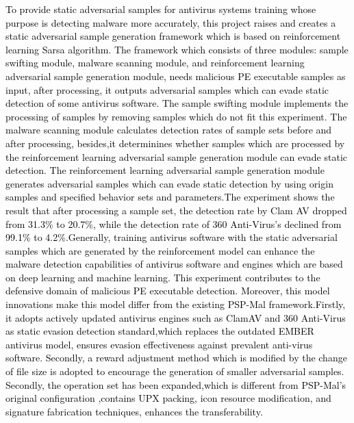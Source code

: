 \begin{abstractEn}
\textcolor{black}{To provide static adversarial samples for antivirus systems training whose purpose is detecting malware more accurately, this project raises and creates a static adversarial sample generation framework which is based on reinforcement learning Sarsa algorithm. The framework which consists of three modules: sample swifting module, malware scanning module, and reinforcement learning adversarial sample generation module, needs malicious PE executable samples as input, after processing, it outputs adversarial samples which can evade static detection of some antivirus software. The sample swifting module implements the processing of samples by removing samples which do not fit this experiment. The malware scanning module calculates detection rates of sample sets before and after processing, besides,it  determinines whether samples which are processed by the reinforcement learning adversarial sample generation module can evade static detection. The reinforcement learning adversarial sample generation module generates adversarial samples which can evade static detection by using origin samples and specified behavior sets and parameters.The experiment shows the result that after processing a sample set, the detection rate by Clam AV dropped from 31.3\% to 20.7\%, while the detection rate of 360 Anti-Virus’s declined from 99.1\% to 4.2\%.Generally, training antivirus software with the static adversarial samples which are generated by the reinforcement model can enhance the malware detection capabilities of antivirus software and engines which are based on deep learning and machine learning. This experiment contributes to the defensive domain of malicious PE executable detection. Moreover, this model innovations make this model differ from the existing PSP-Mal framework.Firstly, it adopts actively updated antivirus engines such as ClamAV and 360 Anti-Virus as static evasion detection standard,which replaces the outdated EMBER antivirus model,  ensures evasion effectiveness against prevalent anti-virus software. Secondly, a reward adjustment method which is modified by the change of file size is adopted to encourage the generation of smaller adversarial samples. Secondly, the operation set has been expanded,which is different from PSP-Mal's original configuration ,contains UPX packing, icon resource modification, and signature fabrication techniques, enhances the transferability.}
\end{abstractEn}
